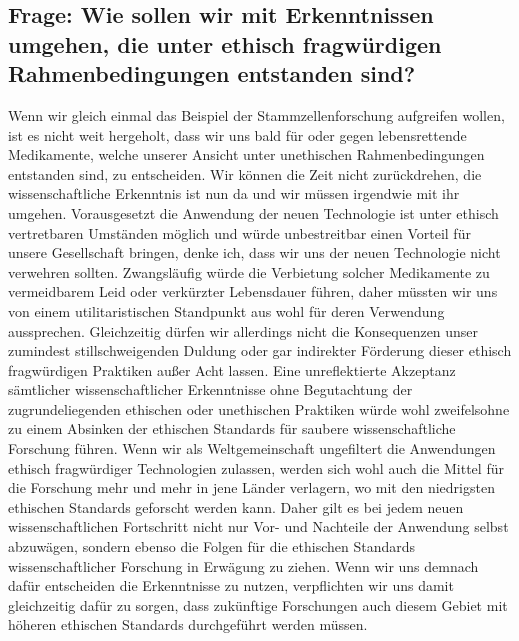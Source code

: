 \documentclass[twoside, a4paper, DIV=11, open=any, bibliography=totoc]{scrbook}
\begin{document}
%

\subsection{Frage: Wie sollen wir mit Erkenntnissen umgehen, die unter ethisch fragwürdigen Rahmenbedingungen entstanden sind?}

Wenn wir gleich einmal das Beispiel der Stammzellenforschung aufgreifen wollen,
ist es nicht weit hergeholt, dass wir uns bald für oder gegen lebensrettende Medikamente,
welche unserer Ansicht unter unethischen Rahmenbedingungen entstanden sind, zu entscheiden.
Wir können die Zeit nicht zurückdrehen, die wissenschaftliche Erkenntnis ist nun da
und wir müssen irgendwie mit ihr umgehen. Vorausgesetzt die Anwendung der neuen
Technologie ist unter ethisch vertretbaren Umständen möglich und würde unbestreitbar
einen Vorteil für unsere Gesellschaft bringen, denke ich, dass wir
uns der neuen Technologie nicht verwehren sollten. Zwangsläufig würde die Verbietung
solcher Medikamente zu vermeidbarem Leid oder verkürzter Lebensdauer führen, daher
müssten wir uns von einem utilitaristischen Standpunkt aus wohl für deren Verwendung aussprechen.
Gleichzeitig dürfen wir allerdings nicht die Konsequenzen unser zumindest stillschweigenden
Duldung oder gar indirekter Förderung dieser ethisch fragwürdigen Praktiken außer Acht lassen.
Eine unreflektierte Akzeptanz sämtlicher wissenschaftlicher Erkenntnisse ohne
Begutachtung der zugrundeliegenden ethischen oder unethischen Praktiken würde wohl
zweifelsohne zu einem Absinken der ethischen Standards für saubere wissenschaftliche Forschung führen.
Wenn wir als Weltgemeinschaft ungefiltert die Anwendungen ethisch fragwürdiger Technologien
zulassen, werden sich wohl auch die Mittel für die Forschung mehr und mehr in jene Länder
verlagern, wo mit den niedrigsten ethischen Standards geforscht werden kann.
Daher gilt es bei jedem neuen wissenschaftlichen Fortschritt nicht nur Vor- und Nachteile
der Anwendung selbst abzuwägen, sondern ebenso die Folgen für die ethischen Standards
wissenschaftlicher Forschung in Erwägung zu ziehen.
Wenn wir uns demnach dafür entscheiden die Erkenntnisse zu nutzen, verpflichten
wir uns damit gleichzeitig dafür zu sorgen, dass zukünftige Forschungen auch diesem
Gebiet mit höheren ethischen Standards durchgeführt werden müssen.
\end{document}
